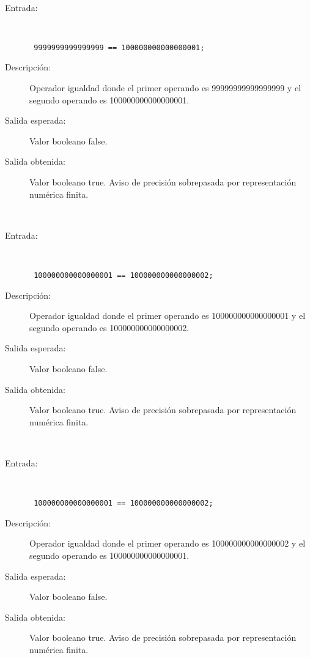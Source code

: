 \hfil \\
	\begin{description}
		\item [Entrada:] \hfill \\
\begin{lstlisting}
 9999999999999999 == 100000000000000001;
\end{lstlisting}
		\item [Descripción:] Operador igualdad donde el primer operando es 99999999999999999 y el segundo operando es  100000000000000001.
		\item [Salida esperada:] Valor booleano false.
		\item [Salida obtenida:] Valor booleano true.  Aviso de precisión sobrepasada por representación numérica finita.
	\end{description}
\hfil \\
	\begin{description}
		\item [Entrada:] \hfill \\
\begin{lstlisting}
 100000000000000001 == 100000000000000002;
\end{lstlisting}
		\item [Descripción:] Operador igualdad donde el primer operando es 100000000000000001 y el segundo operando es  100000000000000002.
		\item [Salida esperada:] Valor booleano false.
		\item [Salida obtenida:] Valor booleano true.  Aviso de precisión sobrepasada por representación numérica finita.
	\end{description}
\hfil \\
	\begin{description}
		\item [Entrada:] \hfill \\
\begin{lstlisting}
 100000000000000001 == 100000000000000002;
\end{lstlisting}
		\item [Descripción:] Operador igualdad donde el primer operando es 100000000000000002 y el segundo operando es  100000000000000001.
		\item [Salida esperada:] Valor booleano false.
		\item [Salida obtenida:] Valor booleano true.  Aviso de precisión sobrepasada por representación numérica finita.
	\end{description}

